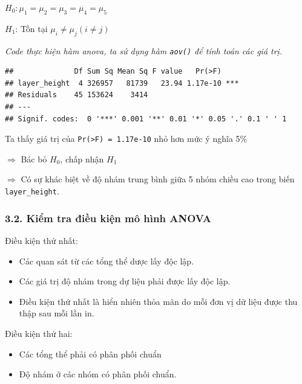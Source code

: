 \(H_0: \mu_1=\mu_2=\mu_3=\mu_4=\mu_5\)

\(H_1\): Tồn tại \(\mu_i \neq \mu_j (i\neq j)\)

\emph{Code thực hiện hàm anova, ta sử dụng hàm \texttt{aov()} để tính
toán các giá trị.}

\begin{Shaded}
\begin{Highlighting}[]
\OtherTok{\textless{}{-}} \SpecialCharTok{\textasciitilde{}}
\end{Highlighting}
\end{Shaded}

\begin{verbatim}
##              Df Sum Sq Mean Sq F value   Pr(>F)    
## layer_height  4 326957   81739   23.94 1.17e-10 ***
## Residuals    45 153624    3414                     
## ---
## Signif. codes:  0 '***' 0.001 '**' 0.01 '*' 0.05 '.' 0.1 ' ' 1
\end{verbatim}

Ta thấy giá trị của \texttt{Pr(\textgreater{}F)\ =\ 1.17e-10} nhỏ hơn
mức ý nghĩa 5\%

\(\Rightarrow\) Bác bỏ \(H_0\), chấp nhận \(H_1\)

\(\Rightarrow\) Có sự khác biệt về độ nhám trung bình giữa 5 nhóm chiều cao trong biến
\texttt{layer\_height}.

\subsubsection{3.2. Kiểm tra điều kiện mô hình ANOVA }

Điều kiện thứ nhất:

\begin{itemize}
\item
  Các quan sát từ các tổng thể dược lấy độc lập.
\item
  Các giá trị độ nhám trong dự liệu phải được lấy độc lập.
\item
  Điều kiện thứ nhất là hiển nhiên thỏa mãn do mỗi đơn vị dữ liệu được
  thu thập sau mỗi lần in.
\end{itemize}

Điều kiện thứ hai:

\begin{itemize}
\item
  Các tổng thể phải có phân phối chuẩn
\item
  Độ nhám ở các nhóm có phân phối chuẩn.
\end{itemize}

